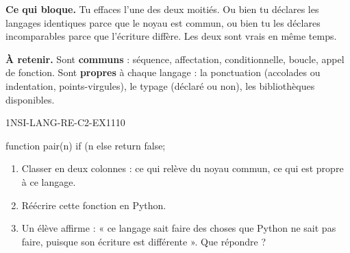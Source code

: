 

\textbf{Ce qui bloque.} Tu effaces l'une des deux moitiés. Ou bien tu déclares les langages
identiques parce que le noyau est commun, ou bien tu les déclares incomparables parce que
l'écriture diffère. Les deux sont vrais en même temps.

\textbf{À retenir.} Sont \textbf{communs} : séquence, affectation, conditionnelle, boucle,
appel de fonction. Sont \textbf{propres} à chaque langage : la ponctuation (accolades ou
indentation, points-virgules), le typage (déclaré ou non), les bibliothèques disponibles.

\begin{exercice}{1NSI-LANG-RE-C2-EX1}{1}{10}
\begin{console}
function pair(n) {
    if (n %
    else { return false; }
}
\end{console}
\begin{enumerate}
  \item Classer en deux colonnes : ce qui relève du noyau commun, ce qui est propre à ce
        langage.
  \item Réécrire cette fonction en Python.
  \item Un élève affirme : « ce langage sait faire des choses que Python ne sait pas faire,
        puisque son écriture est différente ». Que répondre ?
\end{enumerate}
\end{exercice}
